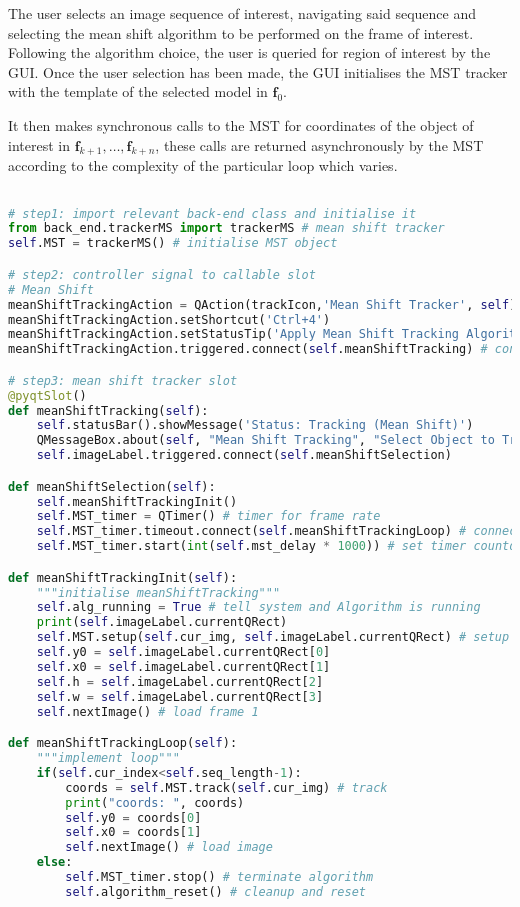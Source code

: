 The user selects an image sequence of interest, navigating said
sequence and selecting the mean shift algorithm to be performed on the frame of
interest.
Following the algorithm choice, the user is queried for region of interest by
the GUI\@. Once the user selection has been made, the GUI initialises the MST
tracker with the template of the selected model in $\mathbf{f}_0$.

It then makes synchronous calls to the MST for coordinates of the object of
interest in $\mathbf{f}_{k+1},\ldots,\mathbf{f}_{k+n}$, these calls are returned
asynchronously by the MST according to the complexity of the particular loop
which varies.





\begin{lstlisting}[language=Python, caption={Mean shift tracker integration in
GUI}, captionpos=b, label={lst:integration}]

# step1: import relevant back-end class and initialise it
from back_end.trackerMS import trackerMS # mean shift tracker
self.MST = trackerMS() # initialise MST object

# step2: controller signal to callable slot
# Mean Shift
meanShiftTrackingAction = QAction(trackIcon,'Mean Shift Tracker', self)
meanShiftTrackingAction.setShortcut('Ctrl+4')
meanShiftTrackingAction.setStatusTip('Apply Mean Shift Tracking Algorithm')
meanShiftTrackingAction.triggered.connect(self.meanShiftTracking) # connect to slot

# step3: mean shift tracker slot
@pyqtSlot()
def meanShiftTracking(self):
    self.statusBar().showMessage('Status: Tracking (Mean Shift)')
    QMessageBox.about(self, "Mean Shift Tracking", "Select Object to Track")
    self.imageLabel.triggered.connect(self.meanShiftSelection)

def meanShiftSelection(self):
    self.meanShiftTrackingInit()
    self.MST_timer = QTimer() # timer for frame rate
    self.MST_timer.timeout.connect(self.meanShiftTrackingLoop) # connect timeouts MSloop
    self.MST_timer.start(int(self.mst_delay * 1000)) # set timer countdown rate

def meanShiftTrackingInit(self):
    """initialise meanShiftTracking"""
    self.alg_running = True # tell system and Algorithm is running
    print(self.imageLabel.currentQRect)
    self.MST.setup(self.cur_img, self.imageLabel.currentQRect) # setup mean shift tracker with coords
    self.y0 = self.imageLabel.currentQRect[0]
    self.x0 = self.imageLabel.currentQRect[1]
    self.h = self.imageLabel.currentQRect[2]
    self.w = self.imageLabel.currentQRect[3]
    self.nextImage() # load frame 1

def meanShiftTrackingLoop(self):
    """implement loop"""   
    if(self.cur_index<self.seq_length-1):
        coords = self.MST.track(self.cur_img) # track    
        print("coords: ", coords)
        self.y0 = coords[0]
        self.x0 = coords[1]
        self.nextImage() # load image    
    else:
        self.MST_timer.stop() # terminate algorithm
        self.algorithm_reset() # cleanup and reset
\end{lstlisting}


